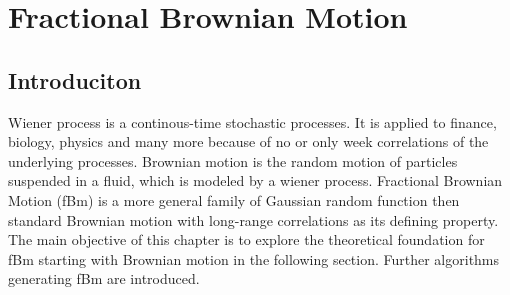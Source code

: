 \documentclass[
  a4paper,BCOR10mm,oneside,
  bibtotoc,idxtotoc,
  headsepline,footsepline,%
  fleqn,openbib
]{scrbook}
\begin{document}
\chapter{Fractional Brownian Motion}
\section{Introduciton}
Wiener process is a continous-time stochastic processes. It is applied to finance, biology, physics and many more because of no or only week correlations of the underlying processes. Brownian motion is the random motion of particles suspended in a fluid, which is modeled by a wiener process.   
Fractional Brownian Motion (fBm) is a more general family of Gaussian random function then standard Brownian motion with long-range correlations as its defining property. The main objective of this chapter is to explore the theoretical foundation for fBm starting with Brownian motion in the following section. Further algorithms generating fBm are introduced.  
\end{document}
